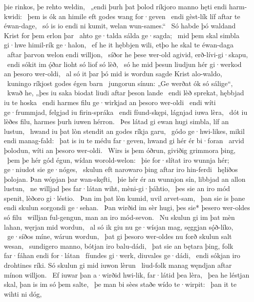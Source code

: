 þie rinkos, þe rehto weldin, \hld\ „endi þurh þat þolod ríkjoro manno
hęti endi harm-kwidi: \hld\ þem is ók an himile eft
godes wang for·geven \hld\ endi gèst-lík líf
aftar te éwan-dage, \hld\ só is io endi ni kumit,
welan wun-sames.“ \hld\ Só habde þó waldand Krist
for þem erlon þar \hld\ ahto ge·talda
sálda ge·sagda; \hld\ mid þem skal simbla gi·hwe
himil-rík ge·halon, \hld\ ef he it hębbjen wili,
etþo he skal te éwan-daga \hld\ aftar þarvon
welon endi willjon, \hld\ síðor he þese wer-old agivid,
erð-lívi-gi·skapu, \hld\ endi sókit im ǫ́ðar lioht
só liof só lèð, \hld\ só he mid þesun liudjun hér
gi·werkod an þesoro wer-oldi, \hld\ al só it þar þó mid is wordun sagde
Krist alo-waldo, \hld\ kuningo ríkjost
godes égen barn \hld\ jungorun sínun:
„Ge werðat ók só sálige“, \hld\ kwað he, „þes iu saka biodat
liudi aftar þeson lande \hld\ endi lèð sprekat,
hębbjad iu te hoska \hld\ endi harmes filu
ge·wirkjad an þesoro wer-oldi \hld\ endi wíti ge·frummjad,
felgjad iu firin-spráka \hld\ endi fíund-skępi,
lágnjad iuwa lèra, \hld\ dót iu lèðes filu,
harmes þurh iuwen hérron. \hld\ Þes látad gi ewan hugi simbla,
líf an lustun, \hld\ hwand iu þat lòn stendit
an godes ríkja garu, \hld\ gódo ge·hwi-likes,
mikil endi manag-fald: \hld\ þat is iu te médu far·geven,
hwand gi hér ér bi·foran \hld\ arvid þolodun,
wíti an þesoro wer-oldi. \hld\ Wirs is þem óðrun,
giviðig grimmora þing, \hld\ þem þe hér gód égun,
wídan worold-welon: \hld\ þie for·slítat iro wunnja hér;
ge·niudot sie ge·nóges, \hld\ skulun eft narowaro þing
aftar iro hin-ferdi \hld\ hęliðos þolojan.
Þan wópjan þar wan-skęfti, \hld\ þie hér ér an wunnjon sín,
libbjad an allon lustun, \hld\ ne willjad þes far·látan wiht,
mèni-gi·þáhtio, \hld\ þes sie an iro mód spenit,
lèðoro gi·léstio. \hld\ Þan im þat lòn kumid,
uvil arvet-sam, \hld\ þan sie is þane endi skulun
sorgondi ge·sehan. \hld\ Þan wirðid im sèr hugi,
þes sie* þesero wer-oldes só filu \hld\ willjan ful-gengun,
man an iro mód-sevon. \hld\ Nu skulun gi im þat mèn lahan,
węrjan mid wordun, \hld\ al só ik giu nu ge·wísjan mag,
sęggjan sǫ́ð-líko, \hld\ ge·síðos míne,
wárun wordun, \hld\ þat gi þesoro wer-oldes nu forð
skulun salt wesan, \hld\ sundigero manno,
bótjan iro balu-dádi, \hld\ þat sie an bętara þing,
folk far·fáhan endi for·látan \hld\ fíundes gi·werk,
diuvales ge·dádi, \hld\ endi sókjan iro drohtines ríki.
Só skulun gi mid iuwon lèrun \hld\ liud-folk manag
węndjan aftar mínon willjon. \hld\ Ef iuwar þan a·wirðid hwi-lik,
far·látid þea lèra, \hld\ þea he léstjan skal,
þan is im só þem salte, \hld\ þe man bi sèes staðe
wído te·wirpit: \hld\ þan it te wihti ni dóg,
